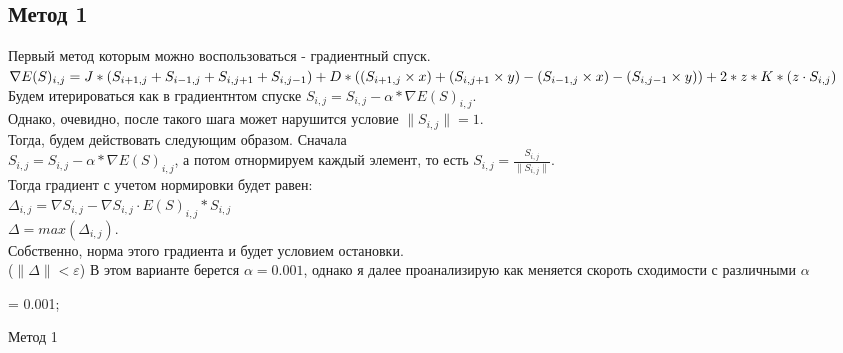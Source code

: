 \documentclass[ 12pt,x11names]{article}
\begin{document}
    \subsection{Метод 1}
    Первый метод которым можно воспользоваться  - градиентный спуск.\\
    $\nabla E(S)_{i, j} = J * (S_{i + 1,j} + S_{i - 1,j} + S_{i, j + 1} + S_{i, j - 1})
        + \\ D * ( (S_{i + 1,j} \times x) + (S_{i, j + 1} \times y) -  (S_{i - 1, j} \times x) - (S_{i, j - 1} \times y) )\\
        + 2 * z * K * (z \cdot S_{i, j})$\\
    Будем  итерироваться как в градиентнтом спуске $S_{i, j} = S_{i, j} - \alpha * \nabla E(S)_{i, j}$.\\
    Однако, очевидно, после такого шага может  нарушится условие $\|S_{i, j}\| = 1$.\\
    Тогда, будем действовать следующим образом. Сначала \\$S_{i, j} = S_{i, j} - \alpha * \nabla E(S)_{i, j}$, а потом отнормируем каждый элемент, то есть $S_{i, j} = \frac{S_{i, j}}{\|S_{i, j}\|}$.\\
    Тогда градиент с учетом нормировки будет равен:\\
    $\Delta_{i, j} = \nabla S_{i, j} - \nabla S_{i, j} \cdot E(S)_{i, j} * S_{i, j}$\\
    $\Delta = max(\Delta_{i, j}).$\\
    Собственно, норма этого градиента и будет условием остановки.\\
    ($\| \Delta \|< \varepsilon$)
    В этом варианте берется $\alpha = 0.001$, однако я далее проанализирую как меняется скороть сходимости  с различными $\alpha$
    \begin{algorithm}[H]
		\SetAlgoLined
		\alpha = 0.001;\\
	\caption{Метод 1}
    \end{algorithm}
\end{document}
